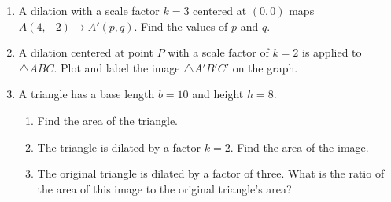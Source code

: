 \begin{enumerate}
\newpage
\item A dilation with a scale factor $k=3$ centered at $(0,0)$ maps $A(4,-2) \rightarrow A'(p,q)$. Find the values of $p$ and $q$. \vspace{2.5cm}

\item A dilation centered at point $P$ with a scale factor of $k=2$ is applied to $\triangle ABC$. Plot and label the image $\triangle A'B'C'$ on the graph.
\begin{center}
  \end{center}

\item A triangle has a base length $b=10$ and height $h=8$. 
\begin{enumerate}[itemsep=1.5cm]
  \item Find the area of the triangle.
  \item The triangle is dilated by a factor $k=2$. Find the area of the image.
  \item The original triangle is dilated by a factor of three. What is the ratio of the area of this image to the original triangle's area?
\end{enumerate}


\end{enumerate}
